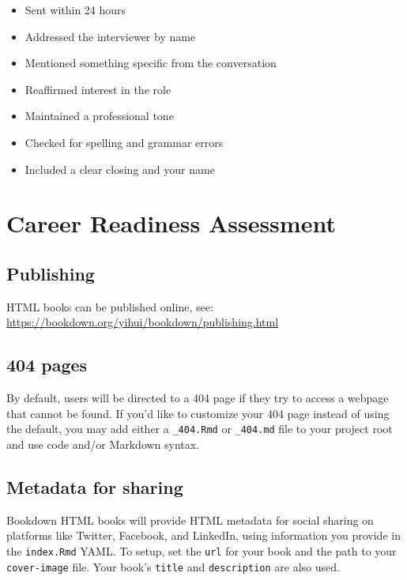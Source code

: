\documentclass[
]{book}
\providecommand{\tightlist}{%
  \setlength{\itemsep}{0pt}\setlength{\parskip}{0pt}}
\theoremstyle{definition}
\theoremstyle{definition}
\theoremstyle{definition}
\theoremstyle{definition}
\theoremstyle{remark}
\begin{document}
\begin{itemize}
\tightlist
\item[$\square$]
  Sent within 24 hours\\
\item[$\square$]
  Addressed the interviewer by name\\
\item[$\square$]
  Mentioned something specific from the conversation\\
\item[$\square$]
  Reaffirmed interest in the role\\
\item[$\square$]
  Maintained a professional tone\\
\item[$\square$]
  Checked for spelling and grammar errors\\
\item[$\square$]
  Included a clear closing and your name
\end{itemize}

\chapter{Career Readiness Assessment}\label{career-readiness-assessment}

\section{Publishing}\label{publishing-1}

HTML books can be published online, see: \url{https://bookdown.org/yihui/bookdown/publishing.html}

\section{404 pages}\label{pages-1}

By default, users will be directed to a 404 page if they try to access a webpage that cannot be found. If you'd like to customize your 404 page instead of using the default, you may add either a \texttt{\_404.Rmd} or \texttt{\_404.md} file to your project root and use code and/or Markdown syntax.

\section{Metadata for sharing}\label{metadata-for-sharing-1}

Bookdown HTML books will provide HTML metadata for social sharing on platforms like Twitter, Facebook, and LinkedIn, using information you provide in the \texttt{index.Rmd} YAML. To setup, set the \texttt{url} for your book and the path to your \texttt{cover-image} file. Your book's \texttt{title} and \texttt{description} are also used.
\end{document}
